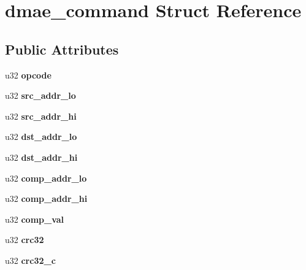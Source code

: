 \hypertarget{structdmae__command}{
\section{dmae\_\-command Struct Reference}
\label{structdmae__command}
}
\subsection*{Public Attributes}
\begin{DoxyCompactItemize}
\item 
\hypertarget{structdmae__command_ab675c8fb0997c271deab0bbd9f84a496}{
u32 {\bfseries opcode}}
\label{structdmae__command_ab675c8fb0997c271deab0bbd9f84a496}

\item 
\hypertarget{structdmae__command_aab8b8e15b57bc41fe46e42d3c9445db0}{
u32 {\bfseries src\_\-addr\_\-lo}}
\label{structdmae__command_aab8b8e15b57bc41fe46e42d3c9445db0}

\item 
\hypertarget{structdmae__command_a0d0869e60cdd241a942cdb4c4ba36687}{
u32 {\bfseries src\_\-addr\_\-hi}}
\label{structdmae__command_a0d0869e60cdd241a942cdb4c4ba36687}

\item 
\hypertarget{structdmae__command_a1a5717e6873782c3a5b585d0c807c802}{
u32 {\bfseries dst\_\-addr\_\-lo}}
\label{structdmae__command_a1a5717e6873782c3a5b585d0c807c802}

\item 
\hypertarget{structdmae__command_a32b44edfd7de3304bc185827d0b84434}{
u32 {\bfseries dst\_\-addr\_\-hi}}
\label{structdmae__command_a32b44edfd7de3304bc185827d0b84434}

\item 
\hypertarget{structdmae__command_a9eca20491774dec2016e91dd1d349119}{
u32 {\bfseries comp\_\-addr\_\-lo}}
\label{structdmae__command_a9eca20491774dec2016e91dd1d349119}

\item 
\hypertarget{structdmae__command_aa3ab23138a6f6c77209d18b98a6e72fc}{
u32 {\bfseries comp\_\-addr\_\-hi}}
\label{structdmae__command_aa3ab23138a6f6c77209d18b98a6e72fc}

\item 
\hypertarget{structdmae__command_afdcdc18012ebb3c327b268bf92e04030}{
u32 {\bfseries comp\_\-val}}
\label{structdmae__command_afdcdc18012ebb3c327b268bf92e04030}

\item 
\hypertarget{structdmae__command_a6cdc07fd0c8affb350f2402ea9eefb1c}{
u32 {\bfseries crc32}}
\label{structdmae__command_a6cdc07fd0c8affb350f2402ea9eefb1c}

\item 
\hypertarget{structdmae__command_a1e971fbbbb8463dd16b13c686f89fbfa}{
u32 {\bfseries crc32\_\-c}}
\label{structdmae__command_a1e971fbbbb8463dd16b13c686f89fbfa}

\end{DoxyCompactItemize}



